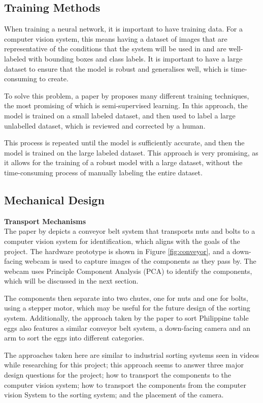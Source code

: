 \subsection{Training Methods}
When training a neural network, it is important to have training data. For a computer vision system, this means having a dataset of images that are representative of the conditions that the system will be used in and
are well-labeled with bounding boxes and class labels. It is important to have a large dataset to ensure that the model is robust and generalises well, which is time-consuming to create.

To solve this problem, a paper by \citet{Yang_2023} proposes many different training techniques, the most promising of which is semi-supervised learning. In this approach, the model is trained on a small labeled dataset, and then
used to label a large unlabelled dataset, which is reviewed and corrected by a human.

This process is repeated until the model is sufficiently accurate, and then the model is trained on the large labeled dataset. This approach
is very promising, as it allows for the training of a robust model with a large dataset, without the time-consuming process of manually labeling the entire dataset.

\subsection{Mechanical Design}

\noindent
\textbf{Transport Mechanisms} \\
The paper by \citet{Dhenge2013MechanicalNS} depicts a conveyor belt system that transports nuts and bolts to a computer vision system for identification, which aligns with the goals of the project. 
The hardware prototype is shown in Figure \ref*{fig:conveyor}, and a down-facing webcam is used to capture images of the components as they pass by. The webcam uses Principle Component Analysis (PCA) to identify the components,
which will be discussed in the next section.

The components then separate into two chutes, one for nuts and one for bolts, using a stepper motor, which may be useful for the future design of the sorting system.
Additionally, the approach taken by the paper \citet{eggsorting} to sort Philippine table eggs also features a similar conveyor belt system, a down-facing camera and an arm to sort the eggs into different categories. 

The approaches taken here are similar to industrial sorting systems seen in videos while researching for this project; this approach seems to answer three major design questions for the project;
how to transport the components to the computer vision system; how to transport the components from the computer vision System to the sorting system; and the placement of the camera.

